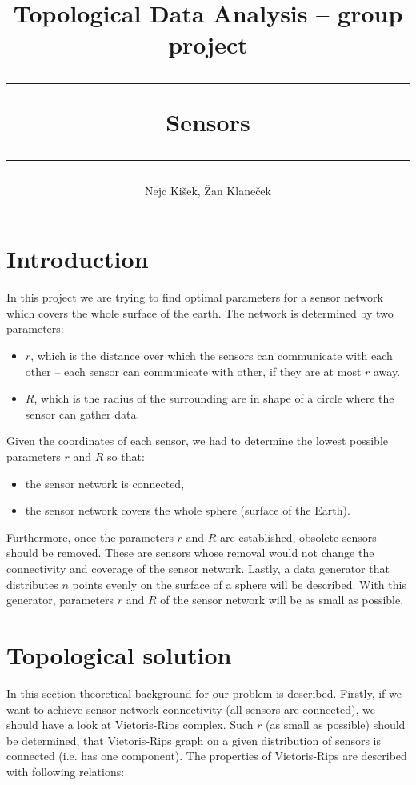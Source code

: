 \documentclass[a4paper, 12pt]{article}
\title{
{\large Topological Data Analysis -- group project} \\
	\vspace{3mm}
	\hrule
	\vspace{3mm}
Sensors
	\vspace{3mm}
	\hrule
}
\author{
	Nejc Ki\v sek,
	\v Zan Klane\v cek
}
\begin{document}
\maketitle


\section{Introduction}
In this project we are trying to find optimal parameters for a sensor network which covers the whole surface of the earth. The network is determined by two parameters: 
\begin{itemize}
	\item $r$, which is the distance over which the sensors can communicate with each other -- each sensor can communicate with other, if they are at most $r$ away.
	\item $R$, which is the radius of the surrounding are in shape of a circle where the sensor can gather data.
\end{itemize}

\noindent Given the coordinates of each sensor, we had to determine the lowest possible parameters $r$ and $R$ so that:

\begin{itemize}
	\item {the sensor network is connected,}
	\item {the sensor network covers the whole sphere (surface of the Earth).}
\end{itemize}
Furthermore, once the parameters $r$ and $R$ are established, obsolete sensors should be removed. These are sensors whose removal would not change the connectivity and coverage of the sensor network. Lastly, a data generator that distributes $n$ points evenly on the surface of a sphere will be described. With this generator, parameters $r$ and $R$ of the sensor network will be as small as possible.
\section{Topological solution}

In this section theoretical background for our problem is described. Firstly, if we want to achieve sensor network connectivity (all sensors are connected), we should have a look at Vietoris-Rips complex. Such $r$ (as small as possible) should be determined, that Vietoris-Rips graph on a given distribution of sensors is connected (i.e. has one component). The properties of Vietoris-Rips are described with following relations:
\end{document}
